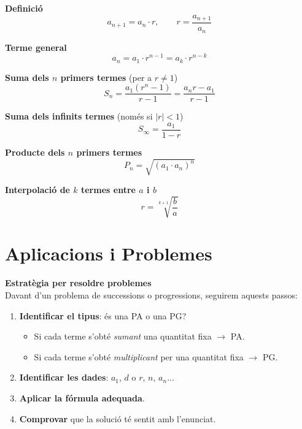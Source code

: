 \documentclass[12pt]{article}
\begin{document}
\begin{resum}[title=Resum 3: Progressions Geomètriques]
\textbf{Definició}
\[
a_{n+1} = a_n \cdot r, \qquad r = \dfrac{a_{n+1}}{a_n}
\]

\textbf{Terme general}
\[
a_n = a_1 \cdot r^{n-1} = a_k \cdot r^{n-k}
\]

\textbf{Suma dels $n$ primers termes} (per a $r \neq 1$)
\[
S_n = \dfrac{a_1(r^n-1)}{r-1} = \dfrac{a_n r - a_1}{r-1}
\]

\textbf{Suma dels infinits termes} (només si $|r|<1$)
\[
S_\infty = \dfrac{a_1}{1-r}
\]

\textbf{Producte dels $n$ primers termes}
\[
P_n = \sqrt{(a_1 \cdot a_n)^n}
\]

\textbf{Interpolació de $k$ termes entre $a$ i $b$}
\[
r = \sqrt[k+1]{\dfrac{b}{a}}
\]
\end{resum}

\newpage

\section{Aplicacions i Problemes}

\begin{concept}
\textbf{Estratègia per resoldre problemes}\\
Davant d'un problema de successions o progressions, seguirem aquests passos:
\begin{enumerate}
    \item \textbf{Identificar el tipus}: és una PA o una PG?
    \begin{itemize}
        \item Si cada terme s'obté \emph{sumant} una quantitat fixa $\to$ PA.
        \item Si cada terme s'obté \emph{multiplicant} per una quantitat fixa $\to$ PG.
    \end{itemize}
    \item \textbf{Identificar les dades}: $a_1$, $d$ o $r$, $n$, $a_n$...
    \item \textbf{Aplicar la fórmula adequada}.
    \item \textbf{Comprovar} que la solució té sentit amb l'enunciat.
\end{enumerate}
\end{concept}
\end{document}
